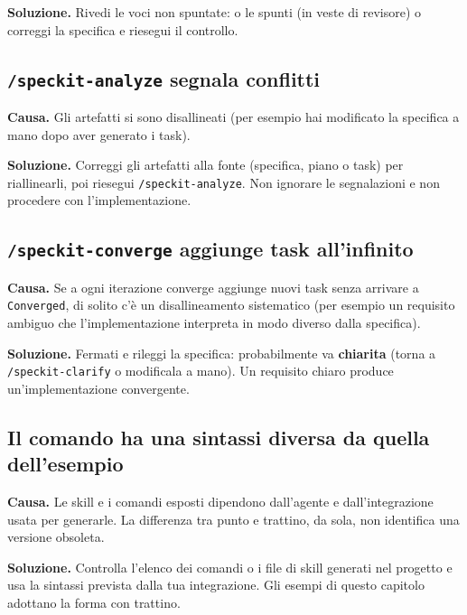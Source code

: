 \documentclass[
  italian,
  10pt,
]{book}
\begin{document}
\textbf{Soluzione.} Rivedi le voci non spuntate: o le spunti (in veste
di revisore) o correggi la specifica e riesegui il controllo.

\subsection{\texorpdfstring{\texttt{/speckit-analyze} segnala
conflitti}{/speckit-analyze segnala conflitti}}\label{speckit-analyze-segnala-conflitti}

\textbf{Causa.} Gli artefatti si sono disallineati (per esempio hai
modificato la specifica a mano dopo aver generato i task).

\textbf{Soluzione.} Correggi gli artefatti alla fonte (specifica, piano
o task) per riallinearli, poi riesegui \texttt{/speckit-analyze}. Non
ignorare le segnalazioni e non procedere con l'implementazione.

\subsection{\texorpdfstring{\texttt{/speckit-converge} aggiunge task
all'infinito}{/speckit-converge aggiunge task all'infinito}}\label{speckit-converge-aggiunge-task-allinfinito}

\textbf{Causa.} Se a ogni iterazione converge aggiunge nuovi task senza
arrivare a \texttt{Converged}, di solito c'è un disallineamento
sistematico (per esempio un requisito ambiguo che l'implementazione
interpreta in modo diverso dalla specifica).

\textbf{Soluzione.} Fermati e rileggi la specifica: probabilmente va
\textbf{chiarita} (torna a \texttt{/speckit-clarify} o modificala a
mano). Un requisito chiaro produce un'implementazione convergente.

\subsection{Il comando ha una sintassi diversa da quella
dell'esempio}\label{il-comando-ha-una-sintassi-diversa-da-quella-dellesempio}

\textbf{Causa.} Le skill e i comandi esposti dipendono dall'agente e
dall'integrazione usata per generarle. La differenza tra punto e
trattino, da sola, non identifica una versione obsoleta.

\textbf{Soluzione.} Controlla l'elenco dei comandi o i file di skill
generati nel progetto e usa la sintassi prevista dalla tua integrazione.
Gli esempi di questo capitolo adottano la forma con trattino.
\end{document}
